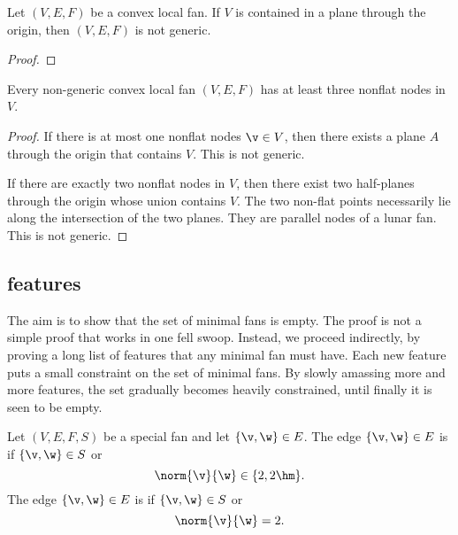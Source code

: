 \begin{lemma}[]
Let $(V,E,F)$ be a convex local fan.  If $V$ is contained in a plane
through the origin, then $(V,E,F)$ is not generic.
\end{lemma}

\begin{proof}
\end{proof}

\begin{lemma}[]\label{lemma:3-nonflat}
Every non-generic convex local fan $(V,E,F)$ has at least three nonflat
nodes in $V$.
\end{lemma}

\begin{proof}
If there is at most one nonflat nodes $\v\in V$, then there exists
a plane $A$ through the origin that contains $V$.  This is not
generic.

If there are exactly two nonflat nodes in $V$, then
there exist two half-planes through the origin whose union contains
$V$.  The two non-flat points necessarily lie along the intersection
of the two planes.  They are parallel nodes of a lunar fan.
This is not generic.
\end{proof}

\subsection{features}

The aim is to show that the set of minimal fans is empty.  The proof
is not a simple proof that works in one fell swoop.  Instead, we
proceed indirectly, by proving a long list of features that any
minimal fan must have.  Each new feature puts a small constraint on
the set of minimal fans.  By slowly amassing more and more features,
the set gradually becomes heavily constrained, until finally it is
seen to be empty.

\begin{definition}
 Let $(V,E,F,S)$ be a special fan
and let $\{\v,\w\}\in E$.  The edge $\{\v,\w\}\in E$ is
 if $\{\v,\w\}\in S$ or
\begin{displaymath}
\norm{\v}{\w}\in\{2,2\hm\}.
\end{displaymath}
The edge $\{\v,\w\}\in E$ is  if $\{\v,\w\}\in S$ or
\begin{displaymath}
\norm{\v}{\w}=2.
\end{displaymath}
\end{definition}

